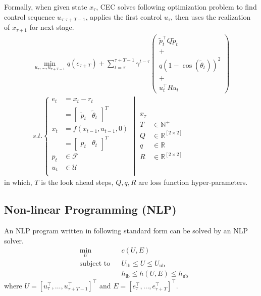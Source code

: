 \documentclass[conference]{IEEEtran}
\begin{document}
Formally, when given state $x_\tau$, 
CEC solves following optimization problem to find control sequence $u_{\tau:\tau+T-1}$, 
applies the first control $u_\tau$, then uses the realization of $x_{\tau+1}$ for next stage.
\[
\begin{gathered}
\min_{{u}_\tau, \ldots, {u}_{\tau+T-1}} 
q({e}_{\tau+T}) + 
\sum_{t=\tau}^{\tau+T-1} \gamma^{t-\tau} 
\left( 
    \begin{gathered}
        \tilde{p}_t^\top Q \tilde{p}_t  \\ 
        +\\
        q(1 - \cos(\tilde{\theta}_t))^2 \\
        +\\
        {u}_t^\top R {u}_t 
    \end{gathered} 
\right) \\
s.t. \left\{
\begin{aligned}
{e}_{t} 
    &= x_{t} - r_{t} \\
    &= \left[\begin{matrix}\tilde{p}_t&\tilde{\theta}_t\end{matrix}\right]^T \\
x_{t} 
    &= f({x}_{t-1}, {u}_{t-1}, 0) \\
    &= \left[ \begin{matrix}p_{t} & \theta_{t} \end{matrix}  \right]^T \\
{p}_t
    &\in \mathcal{F} \\
{u}_t
    &\in \mathcal{U} \\
\end{aligned}
\middle|
\begin{aligned}
    x_\tau\\
    T &\in \mathbb{N}^+\\
    Q &\in \mathbb{R}^{[2\times 2]} \\
    q &\in \mathbb{R} \\
    R &\in \mathbb{R}^{[2\times 2]}
\end{aligned}
\right.
\end{gathered}
\]
in which, $T$ is the look ahead steps, 
$Q,q,R$ are loss function hyper-parameters.

\subsection{Non-linear Programming (NLP)}
An NLP program written in following standard form can be solved by an NLP solver.
\[
\begin{aligned}
&\min_{{U}} & & c({U}, {E}) \\
&\text{subject to} & & {U}_{\text{lb}} \leq {U} \leq {U}_{\text{ub}} \\
& & & {h}_{\text{lb}} \leq {h}({U}, {E}) \leq {h}_{\text{ub}}
\end{aligned}
\]
where \( {U} = [{u}_\tau^\top, \ldots, {u}_{\tau+T-1}^\top]^\top \) and \( {E} = [{e}_\tau^\top, \ldots, {e}_{\tau+T}^\top]^\top \).
\end{document}
